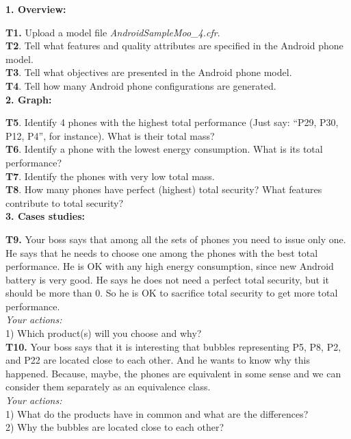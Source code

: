 \documentclass{acm_proc_article-sp}
\begin{document}
\textbf{1. Overview:}

\textbf{T1.} Upload a model file \textit{AndroidSampleMoo\_4.cfr}.\\
\textbf{T2}. Tell what features and quality attributes are specified in the Android phone model.\\
\textbf{T3}. Tell what objectives are presented in the Android phone model.\\
\textbf{T4}. Tell how many Android phone configurations are generated.\\

\textbf{2. Graph:}

\textbf{T5}. Identify 4 phones with the highest total performance (Just say: “P29, P30, P12, P4”, for instance). What is their total mass?\\
\textbf{T6}. Identify a phone with the lowest energy consumption. What is its total performance?\\
\textbf{T7}. Identify the phones with very low total mass.\\
\textbf{T8}. How many phones have perfect (highest) total security? What features contribute to total security?\\

\textbf{3. Cases studies:}

\textbf{T9.} Your boss says that among all the sets of phones you need to issue only one. He says that he needs to choose one among the phones with the best total performance. He is OK with any high energy consumption, since new Android battery is very good. He says he does not need a perfect total security, but it should be more than 0. So he is OK to sacrifice total security to get more total performance.\\
\textit{Your actions:}\\
1) Which product(s) will you choose and why?\\

\textbf{T10.} Your boss says that it is interesting that bubbles representing P5, P8, P2, and P22 are located close to each other. And he wants to know why this happened. Because, maybe, the phones are equivalent in some sense and we can consider them separately as an equivalence class.\\
\textit{Your actions:}\\
1) What do the products have in common and what are the differences?\\
2) Why the bubbles are located close to each other?\\
\end{document}
